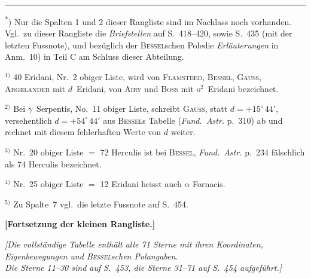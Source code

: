 \documentclass[12pt,a4paper]{article}
\theoremstyle{plain}
\theoremstyle{definition}
\theoremstyle{remark}
\begin{document}
\medskip
\noindent\rule{\textwidth}{0.4pt}
\begin{footnotesize}
\textsuperscript{*}) Nur die Spalten 1 und 2 dieser Rangliste sind im Nachlass noch vorhanden.
Vgl.~zu dieser Rangliste die \textit{Briefstellen} auf S.~418--420, sowie S.~435 (mit der letzten
Fussnote), und bez\"uglich der \glqq\textsc{Bessel}schen Pole\grqq die \textit{Erl\"auterungen} in Anm.~10)
in Teil C am Schluss dieser Abteilung.

$^{1)}$ 40 Eridani, Nr.~2 obiger Liste, wird von \textsc{Flamsteed}, \textsc{Bessel}, \textsc{Gau\ss},
\textsc{Argelander} mit $d$~Eridani, von \textsc{Airy} und \textsc{Boss} mit $o^{2}$~Eridani bezeichnet.

$^{2)}$ Bei $\gamma$~Serpentis, No.~11 obiger Liste, schreibt \textsc{Gau\ss}, statt $d = +15^{\circ}\,44'$,
versehentlich $d = +54^{\circ}\,44'$ aus \textsc{Bessel}s Tabelle (\textit{Fund.~Astr.} p.~310) ab
und rechnet mit diesem fehlerhaften Werte von $d$ weiter.

$^{3)}$ Nr.~20 obiger Liste $=$ 72 Herculis ist bei \textsc{Bessel}, \textit{Fund.~Astr.} p.~234
f\"alschlich als 74 Herculis bezeichnet.

$^{4)}$ Nr.~25 obiger Liste $=$ 12 Eridani heisst auch $\alpha$ Fornacis.

$^{5)}$ Zu Spalte~7 vgl.~die letzte Fussnote auf S.~454.
\end{footnotesize}

\newpage
\noindent\textbf{[Fortsetzung der kleinen Rangliste.]}

\begin{small}
\begin{center}
\textit{[Die vollst\"andige Tabelle enth\"alt alle 71 Sterne mit ihren Koordinaten,\\
Eigenbewegungen und \textsc{Bessel}schen Polangaben.\\
Die Sterne 11--30 sind auf S.~453, die Sterne 31--71 auf S.~454 aufgef\"uhrt.]}
\end{center}
\end{small}
\end{document}
